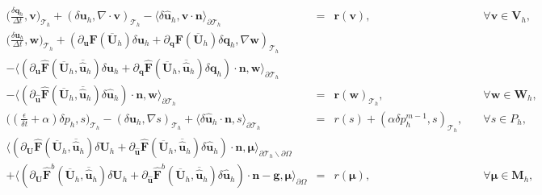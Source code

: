 \documentclass[11pt]{article}
\begin{document}
\begin{equation}
\begin{array}{rcll}
\displaystyle  \Big(\frac{\delta \bm{q}_h}{\Delta t}, \bm{v}\Big)_{\mathcal{T}_h} + (\delta \bm{u}_h, \nabla \cdot \bm{v})_{\mathcal{T}_h} - \langle \delta \widehat{\bm{u}}_h, \bm{v} \cdot \bm{n} \rangle_{\partial \mathcal{T}_h}  & = & \bm{r}(\bm{v}), & \quad \forall \bm{v} \in \bm{V}_h, \\[2ex] 
\displaystyle \Big(\frac{\delta \bm{u}_h}{\Delta t}, \bm{w} \Big)_{\mathcal{T}_h} + (\partial_{\bm{u}} \bm{F} (\overline{\bm{U}}_h) \delta \bm{u}_h + \partial_{\bm{q}} \bm{F} (\overline{\bm{U}}_h) \delta \bm{q}_h, \nabla \bm{w})_{\mathcal{T}_h} & & \\[2ex]
- \langle (\partial_{\bm{u}} \widehat{\bm{F}} (\overline{\bm{U}}_h,\overline{\widehat{\bm{u}}}_h) \delta \bm{u}_h + \partial_{{\bm{q}}} \widehat{\bm{F}} (\overline{\bm{U}}_h,\overline{\widehat{\bm{u}}}_h) \delta {\bm{q}}_h) \cdot \bm{n}, \bm{w} \rangle_{\partial \mathcal{T}_h} & & \\[2ex]
 - \langle (\partial_{\widehat{\bm{u}}} \widehat{\bm{F}} (\overline{\bm{U}}_h,  \overline{\widehat{\bm{u}}}_h) \delta \widehat{\bm{u}}_h) \cdot \bm{n}, \bm{w} \rangle_{\partial \mathcal{T}_h}   & = &  \bm{r}(\bm{w})_{\mathcal{T}_h},  & \quad \forall \bm{w} \in \bm{W}_h, \\[2ex]
\displaystyle  \Big((\frac{\epsilon}{\delta t} + \alpha) \delta p_h, s\Big)_{\mathcal{T}_h} - (\delta \bm{u}_h, \nabla s)_{\mathcal{T}_h} + \langle \delta \widehat{\bm{u}}_h \cdot \bm{n},s \rangle_{\partial \mathcal{T}_h}  & = & r(s) +  (\alpha \delta p_h^{m-1}, s)_{\mathcal{T}_h}, & \quad \forall s \in P_h, \\[2ex]
 \langle (\partial_{\bm{U}} \widehat{\bm{F}} (\overline{\bm{U}}_h, \overline{\widehat{\bm{u}}}_h) \delta\bm{U}_h + \partial_{\widehat{\bm{u}}} \widehat{\bm{F}} (\overline{\bm{U}}_h, \overline{\widehat{\bm{u}}}_h) \delta \widehat{\bm{u}}_h ) \cdot \bm{n}, \bm{\mu} \rangle_{\partial \mathcal{T}_h \backslash \partial \Omega} & & \\[2ex]
  + \langle (\partial_{\bm{U}} \widehat{\bm{F}}^b (\overline{\bm{U}}_h, \overline{\widehat{\bm{u}}}_h) \delta\bm{U}_h + \partial_{\widehat{\bm{u}}} \widehat{\bm{F}}^b (\overline{\bm{U}}_h, \overline{\widehat{\bm{u}}}_h) \delta \widehat{\bm{u}}_h ) \cdot \bm{n}  - \bm{g}, \bm{\mu} \rangle_{\partial \Omega}  & = & r(\bm{\mu}), & \quad \forall \bm{\mu} \in \bm{M}_h ,
\end{array}
\end{equation}
\end{document}
